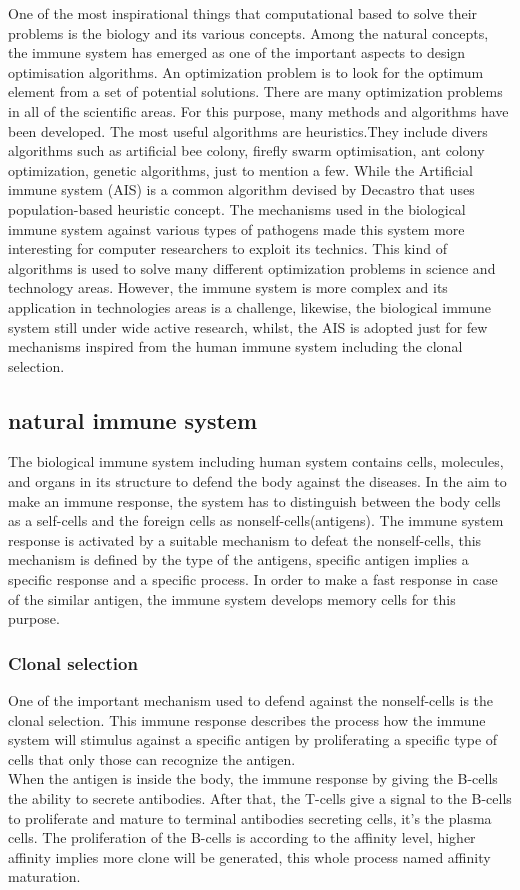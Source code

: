 \documentclass[conference]{IEEEtran}
\begin{document}
One of the most inspirational things that computational based to solve their problems\cite{doc7} is the biology and its various concepts. Among the natural concepts, the immune system has emerged as one of the important aspects to design optimisation algorithms. An optimization problem\cite{doc6} is to look for the optimum element from a set of potential solutions. There are many optimization problems in all of the scientific areas. For this purpose, many methods and algorithms have been developed. The most useful algorithms\cite{doc6} are heuristics.They include divers algorithms such as artificial bee colony, firefly swarm optimisation, ant colony optimization, genetic algorithms, just to mention a few. While the Artificial immune system (AIS) is a common algorithm devised by Decastro\cite{doc6} that uses population-based heuristic concept. The mechanisms used in the biological immune system against various types of pathogens made this system more interesting\cite{doc9} for computer researchers to exploit its technics. This kind of algorithms is used to solve many different optimization problems in science and technology areas. However, the immune system is more complex and its application in technologies areas is a challenge, likewise, the biological immune system\cite{doc7} still under wide active research, whilst, the AIS is adopted just for few mechanisms inspired from the human immune system including the clonal selection.
\subsection{natural immune system}
The biological immune system including human system contains cells, molecules, and organs in its structure to defend the body against the diseases. In the aim to make an immune response\cite{doc6}, the system has to distinguish between the body cells as a self-cells and the foreign cells as nonself-cells(antigens). The immune system response is activated by a suitable mechanism\cite{doc6} to defeat the nonself-cells, this mechanism is defined by the type of the antigens, specific antigen implies a specific response and a specific process. In order to make a fast response in case of the similar antigen, the immune system develops memory cells for this purpose.
\subsubsection*{Clonal selection}
One of the important mechanism used to defend against the nonself-cells\cite{doc6} is the clonal selection. This immune response describes the process how the immune system will stimulus against a specific antigen\cite{doc7} by proliferating a specific type of cells that only those can recognize the antigen.\\
When the antigen is inside the body, the immune response\cite{doc6} by giving the B-cells the ability to secrete antibodies. After that, the T-cells give a signal to the B-cells to proliferate and mature to terminal antibodies secreting cells, it's the plasma cells. The proliferation of the B-cells is according to the affinity level, higher affinity implies more clone will be generated, this whole process named affinity maturation.
\end{document}

